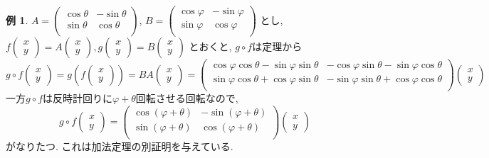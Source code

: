 \documentclass[dvipdfmx,a4paper,11pt]{article}
\theoremstyle{definition}
\newtheorem{exa}[thm]{例}
\begin{document}
 \begin{exa}
$
A=\begin{pmatrix}
\cos \theta & -\sin \theta\\
\sin \theta& \cos \theta  \\
\end{pmatrix}
$, 
$
B=
\begin{pmatrix}
\cos \varphi & -\sin \varphi \\
\sin \varphi & \cos \varphi  \\
\end{pmatrix}
$
とし, 
$
f\begin{pmatrix}
x \\ y
 \end{pmatrix} 
 =
 A
\begin{pmatrix}
x \\ y
 \end{pmatrix},
g\begin{pmatrix}
x \\ y
 \end{pmatrix} 
 =
 B
\begin{pmatrix}
x \\ y
 \end{pmatrix}  
$
とおくと, $g \circ f$は定理から
 $$
 g\circ f 
 \begin{pmatrix}
x \\ y
 \end{pmatrix}  
 = g \left( 
 f\begin{pmatrix}
x \\ y
 \end{pmatrix} 
 \right)
 =BA\begin{pmatrix}
x \\ y
 \end{pmatrix} 
 =
 \begin{pmatrix}
\cos \varphi \cos \theta  - \sin \varphi \sin \theta 
& -\cos \varphi \sin \theta - \sin \varphi \cos \theta \\
\sin \varphi \cos \theta + \cos \varphi \sin \theta
& - \sin \varphi \sin \theta  + \cos \varphi \cos \theta \\
\end{pmatrix}
  \begin{pmatrix}
x \\ y
 \end{pmatrix} 
 $$
一方$g \circ f$は反時計回りに$\varphi + \theta$回転させる回転なので,
$$
 g\circ f 
 \begin{pmatrix}
x \\ y
 \end{pmatrix}  
 =
 \begin{pmatrix}
\cos (\varphi  + \theta)& -\sin (\varphi  + \theta)\\
\sin (\varphi  + \theta)& \cos (\varphi  + \theta)  \\
\end{pmatrix}
   \begin{pmatrix}
x \\ y
 \end{pmatrix} 
$$
がなりたつ. これは加法定理の別証明を与えている. 
\end{exa}
 
\end{document}
